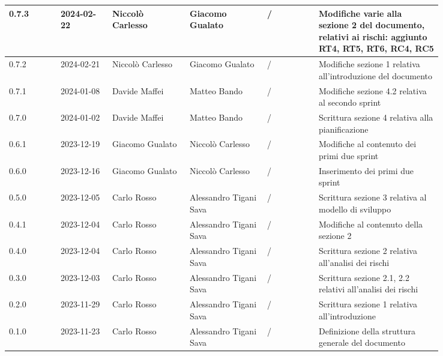 {\begin{longtable}{p{0.10\linewidth}p{0.10\linewidth}p{0.15\linewidth}p{0.15\linewidth}p{0.10\linewidth}p{0.24\linewidth}}
	  \hline
	  0.7.3             & 2024-02-22    & Niccolò Carlesso   & Giacomo Gualato        & /                    & Modifiche varie alla sezione 2 del documento, relativi ai rischi:
	  aggiunto RT4, RT5, RT6, RC4, RC5                                                                                                                                           \\
	  \hline
	  0.7.2             & 2024-02-21    & Niccolò Carlesso   & Giacomo Gualato        & /                    & Modifiche sezione 1 relativa all'introduzione del documento       \\
	  \hline
	  0.7.1             & 2024-01-08    & Davide Maffei      & Matteo Bando           & /                    & Modifiche sezione 4.2 relativa al secondo sprint                  \\
	  \hline
	  0.7.0             & 2024-01-02    & Davide Maffei      & Matteo Bando           & /                    & Scrittura sezione 4 relativa alla pianificazione                  \\
	  \hline
	  0.6.1             & 2023-12-19    & Giacomo Gualato    & Niccolò Carlesso       & /                    & Modifiche al contenuto dei primi due sprint                       \\
	  \hline
	  0.6.0             & 2023-12-16    & Giacomo Gualato    & Niccolò Carlesso       & /                    & Inserimento dei primi due sprint                                  \\
	  \hline
	  0.5.0             & 2023-12-05    & Carlo Rosso        & Alessandro Tigani Sava & /                    & Scrittura sezione 3 relativa al modello di sviluppo               \\
	  \hline
	  0.4.1             & 2023-12-04    & Carlo Rosso        & Alessandro Tigani Sava & /                    & Modifiche al contenuto della sezione 2                            \\
	  \hline
	  0.4.0             & 2023-12-04    & Carlo Rosso        & Alessandro Tigani Sava & /                    & Scrittura sezione 2 relativa all'analisi dei rischi               \\
	  \hline
	  0.3.0             & 2023-12-03    & Carlo Rosso        & Alessandro Tigani Sava & /                    & Scrittura sezione 2.1, 2.2 relativi all'analisi dei rischi        \\
	  \hline
	  0.2.0             & 2023-11-29    & Carlo Rosso        & Alessandro Tigani Sava & /                    & Scrittura sezione 1 relativa all'introduzione                     \\
	  \hline
	  0.1.0             & 2023-11-23    & Carlo Rosso        & Alessandro Tigani Sava & /                    & Definizione della struttura generale del documento                \\
	  \bottomrule
  \end{longtable}
 }
